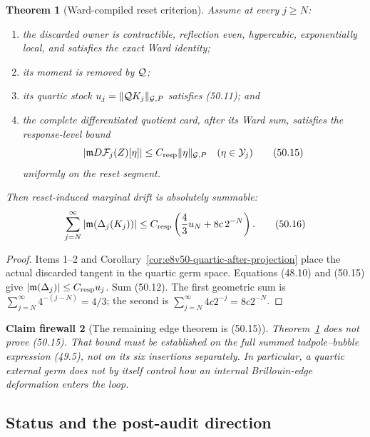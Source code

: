 \documentclass[11pt,oneside]{book}
\newtheorem{theorem}{Theorem}[chapter]
\newtheorem{firewall}[theorem]{Claim firewall}
\theoremstyle{definition}
\theoremstyle{remark}
\begin{document}
\begin{theorem}[Ward-compiled reset criterion]
\label{thm:e8v50-Ward-compiled-reset}
Assume at every \(j\ge N\):
\begin{enumerate}
\item the discarded owner is contractible, reflection even,
      hypercubic, exponentially local, and satisfies the exact Ward
      identity;
\item its moment is removed by \({\cal Q}\);
\item its quartic stock \(u_j=\|{\cal Q}K_j\|_{{\cal G},P}\)
      satisfies (50.11); and
\item the complete differentiated quotient card, after its Ward
      sum, satisfies the response-level bound
      \[
       |{\mathfrak m}D{\cal F}_j(Z)[\eta]|
       \le C_{\rm resp}\|\eta\|_{{\cal G},P}
       \quad(\eta\in{\cal Y}_j)                               \tag{50.15}
      \]
      uniformly on the reset segment.
\end{enumerate}
Then reset-induced marginal drift is absolutely summable:
\[
 \sum_{j=N}^\infty
 |{\mathfrak m}(\Delta_j(K_j))|
 \le C_{\rm resp}
 \left(\frac43u_N+8c\,2^{-N}\right).                          \tag{50.16}
\]
\end{theorem}

\begin{proof}
Items 1--2 and
Corollary~\ref{cor:e8v50-quartic-after-projection} place the actual
discarded tangent in the quartic germ space.  Equations
(48.10) and (50.15) give
\(|{\mathfrak m}(\Delta_j)|\le C_{\rm resp}u_j\).
Sum (50.12).  The first geometric sum is
\(\sum_{j=N}^\infty4^{-(j-N)}=4/3\); the second is
\(\sum_{j=N}^\infty4c2^{-j}=8c2^{-N}\).
\end{proof}

\begin{firewall}[The remaining edge theorem is (50.15)]
\label{fire:e8v50-response-open}
Theorem~\ref{thm:e8v50-Ward-compiled-reset} does not prove
(50.15).  That bound must be established on the full summed
tadpole--bubble expression (49.5), not on its six insertions
separately.  In particular, a quartic external germ does not by
itself control how an internal Brillouin-edge deformation enters
the loop.
\end{firewall}

\subsection{Status and the post-audit direction}
\end{document}
